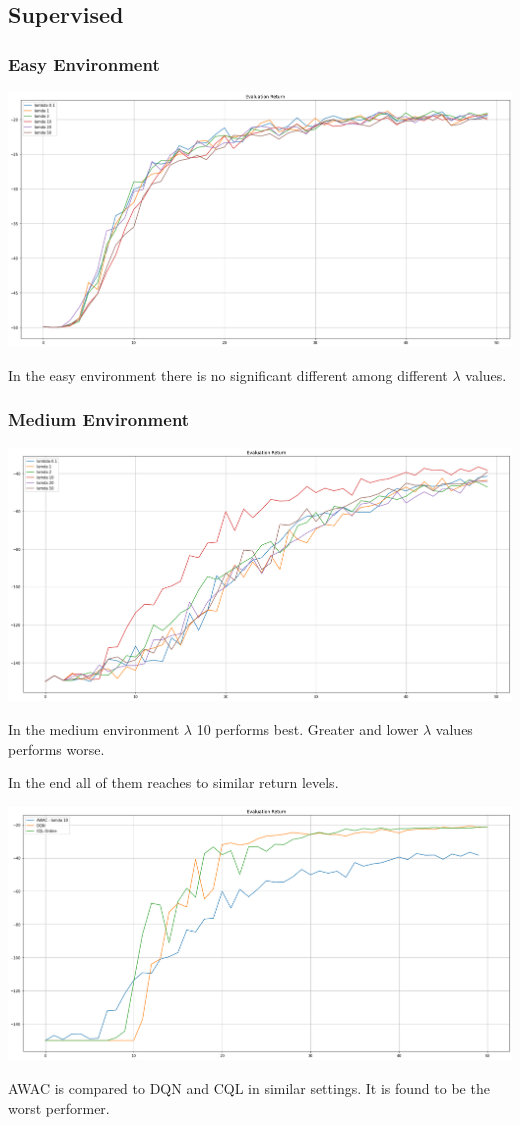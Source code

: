 \documentclass[11pt]{article}
\begin{document}
    \subsection{Supervised}

    \subsubsection{Easy Environment}

    \hspace*{-0.3in}
    \includegraphics[scale=0.30]{q4/eval-easy-supervised}

    In the easy environment there is no significant different among different $\lambda$ values.

    \subsubsection{Medium Environment}

    \hspace*{-0.3in}
    \includegraphics[scale=0.30]{q4/eval-medium-supervised}

    In the medium environment $ \lambda $ 10 performs best.
    Greater and lower $\lambda$ values performs worse.

    In the end all of them reaches to similar return levels.

    \hspace*{-0.3in}
    \includegraphics[scale=0.30]{q4/eval-medium-supervised-compared}

    AWAC is compared to DQN and CQL in similar settings.
    It is found to be the worst performer.
\end{document}
